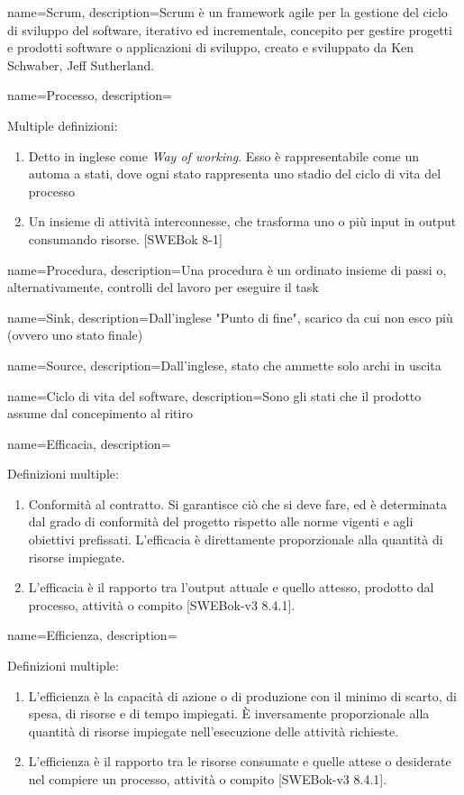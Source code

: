{
name=Scrum,
description={Scrum è un framework agile per la gestione del ciclo di sviluppo del software, iterativo ed incrementale, concepito per gestire progetti e prodotti software o applicazioni di sviluppo, creato e sviluppato da Ken Schwaber, Jeff Sutherland.}
}

{
name=Processo, 
description={Multiple definizioni:
\begin{enumerate}
\item Detto in inglese come \textit{Way of working}. Esso è rappresentabile come un automa a stati, dove ogni stato rappresenta uno stadio del ciclo di vita del processo
\item Un insieme di attività interconnesse, che trasforma uno o più input in output consumando risorse. [SWEBok 8-1]
\end{enumerate}
}
}

{
name=Procedura,
description={Una procedura è un ordinato insieme di passi o, alternativamente, controlli del lavoro per eseguire il task}
}


{
name=Sink,
description={Dall'inglese "Punto di fine", scarico da cui non esco più (ovvero uno stato finale)}
}

{
name=Source,
description={Dall'inglese, stato che ammette solo archi in uscita}
}

{
name=Ciclo di vita del software,
description={Sono gli stati che il prodotto assume dal concepimento al ritiro}
}

{
name=Efficacia,
description={Definizioni multiple:
\begin{enumerate}
\item Conformità al contratto. Si garantisce ciò che si deve fare, ed è determinata dal grado di conformità del progetto rispetto alle norme vigenti e agli obiettivi prefissati. L'efficacia è direttamente proporzionale alla quantità di risorse impiegate.
\item L'efficacia è il rapporto tra l'output attuale e quello attesso, prodotto dal processo, attività o compito [SWEBok-v3 8.4.1].
\end{enumerate}
}
}

{
name=Efficienza,
description={Definizioni multiple: 
\begin{enumerate}
\item L'efficienza è la capacità di azione o di produzione con il minimo di scarto, di spesa, di risorse e di tempo impiegati. \`E inversamente proporzionale alla quantità di risorse impiegate nell'esecuzione delle attività richieste.
\item L'efficienza è il rapporto tra le risorse consumate e quelle attese o desiderate nel compiere un processo, attività o compito [SWEBok-v3 8.4.1].
\end{enumerate}
}
}

